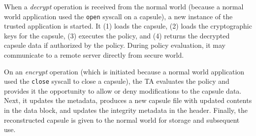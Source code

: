When a {\em decrypt} operation is received from the normal world (because a
normal world application used the {\tt open} syscall on a capsule), a new
instance of the trusted application is started. It (1) loads the capsule, (2)
loads the cryptographic keys for the capsule, (3) executes the policy, and (4)
returns the decrypted capsule data if authorized by the policy. During policy
evaluation, it may communicate to a remote server directly from secure world.

On an {\em encrypt} operation (which is initiated because a normal world
application used the {\tt close} syscall to close a capsule), the TA evaluates
the policy and provides it the opportunity to allow or deny modifications to the
capsule data. Next, it updates the metadata, produces a new capsule file with
updated contents in the data block, and updates the integrity metadata in the
header. Finally, the reconstructed capsule is given to the normal world for
storage and subsequent use.




